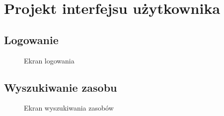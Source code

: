 \section{Projekt interfejsu użytkownika}
\subsection{Logowanie}

\begin{figure}[H]
	\centering
        \vfill
        \noindent
	\caption{Ekran logowania}
\end{figure}

\subsection{Wyszukiwanie zasobu}

\begin{figure}[H]
	\centering
        \vfill
        \noindent
	\caption{Ekran wyszukiwania zasobów}
\end{figure}

